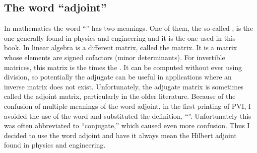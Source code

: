 \subsection{The word ``adjoint''}
In mathematics the word ``'' has two meanings.
One of them, the so-called ,
is the one generally found in physics and engineering
and it is the one used in this book.
In linear algebra is a different matrix,
called the  matrix.
It is a matrix whose elements
are signed cofactors (minor determinants).
For invertible matrices,
this matrix is the  times the .
It can be computed without ever using division,
so potentially the adjugate can be useful in applications
where an inverse matrix does not exist.
Unfortunately, the adjugate matrix is sometimes called the adjoint matrix,
particularly in the older literature.
Because of the confusion of multiple meanings of the word adjoint,
in the first printing of PVI, I avoided the use of the word and
substituted the definition, ``''.
Unfortunately this was often abbreviated to ``conjugate,''
which caused even more confusion.
Thus I decided to use the word adjoint
and have it always mean the Hilbert adjoint
found in physics and engineering.


